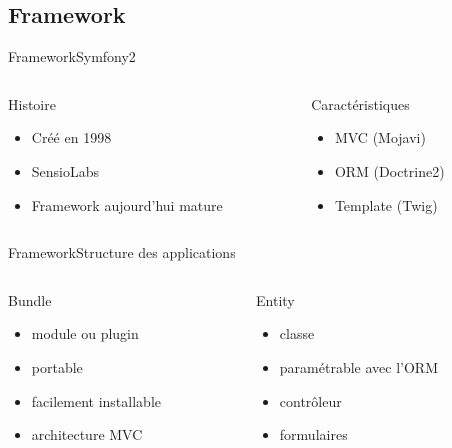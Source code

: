 \subsection{Framework}
\begin{frame}{Framework}{Symfony2}



\begin{columns}[t]
  \begin{column}[l]{0.5\textwidth}
		\begin{block}{Histoire}
			\begin{itemize}
				\item Créé en 1998
				\item SensioLabs
				\item Framework aujourd'hui mature
			\end{itemize}
		\end{block}
	\end{column}
    \begin{column}[l]{0.5\textwidth}
		\begin{block}{Caractéristiques}
			\begin{itemize}
				\item MVC (Mojavi)
				\item ORM (Doctrine2)
				\item Template (Twig)
			\end{itemize}
		\end{block}
	\end{column}
\end{columns}
\end{frame}

\begin{frame}{Framework}{Structure des applications}
\begin{columns}[t]
    \begin{column}[l]{0.5\textwidth}
		\begin{block}{Bundle}
			\begin{itemize}
				\item module ou plugin
				\item portable
				\item facilement installable
				\item architecture MVC
			\end{itemize}
		\end{block}
	\end{column}
    \begin{column}[l]{0.5\textwidth}
		\begin{block}{Entity}
			\begin{itemize}
				\item classe
				\item paramétrable avec l'ORM
				\item contrôleur
				\item formulaires
			\end{itemize}
		\end{block}
	\end{column}
\end{columns}
\end{frame}

